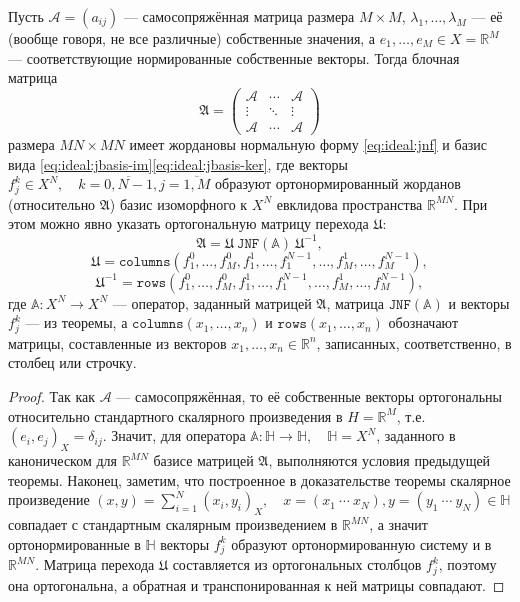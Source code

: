  \begin{corollary}
     Пусть \( \mathcal{A} = (a_{ij}) \) --- самосопряжённая матрица размера \( M\times M \),
     \( \lambda_1, \ldots, \lambda_M \) --- её (вообще говоря, не все различные) собственные значения,
     а \( e_1, \ldots, e_M \in X=\mathbb{R}^M \) --- соответствующие нормированные собственные векторы.
     Тогда блочная матрица
     \[ \mathfrak{A} = \begin{pmatrix}
         \mathcal{A} & \cdots & \mathcal{A} \\
         \vdots & \ddots & \vdots \\
         \mathcal{A} & \cdots & \mathcal{A}
     \end{pmatrix} \]
     размера \( MN\times MN \) имеет жордановы нормальную форму \eqref{eq:ideal:jnf}
     и базис вида \eqref{eq:ideal:jbasis-im}\eqref{eq:ideal:jbasis-ker},
     где векторы \( f_j^k\in X^N,\quad k=\overline{0,N-1},j=\overline{1,M} \)
     образуют ортонормированный жорданов (относительно \( \mathfrak{A} \))
     базис изоморфного к \( X^N \) евклидова пространства \( \mathbb{R}^{MN} \).
     При этом можно явно указать ортогональную матрицу перехода \( \mathfrak{U} \):
     \[
         \mathfrak{A} = \mathfrak{U} ~ \mathtt{JNF}(\mathbb{A}) ~ \mathfrak{U}^{-1}, \]
    \[ \mathfrak{U} = \mathtt{columns}(f_1^0,\ldots,f_M^0,f_1^1,\ldots,f_1^{N-1},\ldots,f_M^1,\ldots,f_M^{N-1}), \]
    \[ \mathfrak{U}^{-1} = \mathtt{rows}(f_1^0,\ldots,f_M^0,f_1^1,\ldots,f_1^{N-1},\ldots,f_M^1,\ldots,f_M^{N-1}), \]
     где \( \mathbb{A}:X^N\to X^N \) --- оператор, заданный матрицей \( \mathfrak{A} \),
     матрица \( \mathtt{JNF(\mathbb{A})} \) и векторы \( f_j^k \) --- из теоремы,
     а \( \mathtt{columns}(x_1,\ldots,x_n) \) и \( \mathtt{rows}(x_1,\ldots,x_n) \) обозначают матрицы,
     составленные из векторов \( x_1, \ldots, x_n \in \mathbb{R}^n \),
     записанных, соответственно, в столбец или строчку.
 \end{corollary}
 \begin{proof}
     Так как \( \mathcal{A} \) --- самосопряжённая,
     то её собственные векторы ортогональны относительно стандартного скалярного произведения в \( H=\mathbb{R}^M \),
     т.е. \( (e_i, e_j)_X = \delta_{ij} \).
     Значит, для оператора \( \mathbb{A}:\mathbb{H}\to\mathbb{H}, \quad \mathbb{H}=X^N \),
     заданного в каноническом для \( \mathbb{R}^{MN} \) базисе матрицей \( \mathfrak{A} \),
     выполняются условия предыдущей теоремы.
     Наконец, заметим, что построенное в доказательстве теоремы
     скалярное произведение \( (x,y) = \sum_{i=1}^N (x_i, y_i)_X, \quad x=(x_1~\cdots~x_N),y=(y_1~\cdots~y_N)\in\mathbb{H} \)
     совпадает с стандартным скалярным произведением в \( \mathbb{R}^{MN} \),
     а значит ортонормированные в \( \mathbb{H} \) векторы \( f_j^k \)
     образуют ортонормированную систему и в \( \mathbb{R}^{MN} \).
     Матрица перехода \( \mathfrak{U} \) составляется из ортогональных столбцов \( f_j^k \),
     поэтому она ортогональна, а обратная и транспонированная к ней матрицы совпадают.
 \end{proof}

